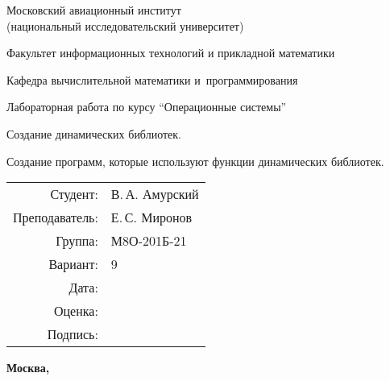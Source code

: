 \documentclass[pdf, unicode, 12pt, a4paper,oneside,fleqn]{article}
\begin{document}
\begin{titlepage}
    \begin{center}
        \bfseries

        {\Large Московский авиационный институт\\ (национальный исследовательский университет)}
        
        \vspace{48pt}
        
        {\large Факультет информационных технологий и прикладной математики}
        
        \vspace{36pt}
        
        {\large Кафедра вычислительной математики и~программирования}
        
        \vspace{48pt}
        
        Лабораторная работа  по курсу \enquote{Операционные системы}

        \vspace{48pt}

        Создание динамических библиотек. 
        
        Создание программ, которые используют функции динамических библиотек.
    \end{center}
    
    \vspace{125pt}
    
    \begin{flushright}
    \begin{tabular}{rl}
    Студент: & В.\,А. Амурский \\
    Преподаватель: & Е.\,С. Миронов \\
    Группа: & М8О-201Б-21 \\
    Вариант: & 9 \\
    Дата: & \\
    Оценка: & \\
    Подпись: & \\
    \end{tabular}
    \end{flushright}
    
    \vfill
    
    \begin{center}
    \bfseries
    Москва, \the\year
    \end{center}
\end{titlepage}
    
\pagebreak
\end{document}
